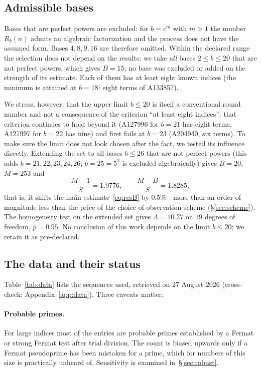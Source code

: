 \documentclass[11pt,a4paper]{article}
\theoremstyle{plain}
\theoremstyle{remark}
\newcommand{\Rb}{R_b}
\begin{document}
\subsection{Admissible bases}\label{sec:bases}
Bases that are perfect powers are excluded: for $b=c^{m}$ with $m>1$ the number
$\Rb(n)$ admits an algebraic factorization and the process does not have the
assumed form. Bases $4,8,9,16$ are therefore omitted. Within the declared range
the selection does not depend on the results: we take \emph{all} bases
$2\le b\le20$ that are not perfect powers, which gives $B=15$; no base was
excluded or added on the strength of its estimate. Each of them has at least
eight known indices (the minimum is attained at $b=18$: eight terms of A133857).

We stress, however, that the upper limit $b\le20$ is itself a conventional round
number and not a consequence of the criterion ``at least eight indices'': that
criterion continues to hold beyond it (A127996 for $b=21$ has eight terms,
A127997 for $b=22$ has nine) and first fails at $b=23$ (A204940, six terms). To
make sure the limit does not look chosen after the fact, we tested its influence
directly. Extending the set to all bases $b\le26$ that are not perfect powers
(this adds $b=21,22,23,24,26$; $b=25=5^2$ is excluded algebraically) gives
$B=20$, $M=253$ and
\[
  \frac{M-1}{S}=1.9776,\qquad \frac{M-B}{S}=1.8285,
\]
that is, it shifts the main estimate~\eqref{eq:resB} by $0.5\%$---more than an
order of magnitude less than the price of the choice of observation scheme
(\S\ref{sec:scheme}). The homogeneity test on the extended set gives
$\Lambda=10.27$ on $19$ degrees of freedom, $p=0.95$. No conclusion of this work
depends on the limit $b\le20$; we retain it as pre-declared.

\subsection{The data and their status}
Table~\ref{tab:data} lists the sequences used, retrieved on 27 August 2026
(cross-check: Appendix~\ref{app:data}). Three caveats matter.

\paragraph{Probable primes.} For large indices most of the entries are probable
primes established by a Fermat or strong Fermat test after trial division. The
count is biased upwards only if a Fermat pseudoprime has been mistaken for a
prime, which for numbers of this size is practically unheard of. Sensitivity is
examined in~\S\ref{sec:robust}.
\end{document}
